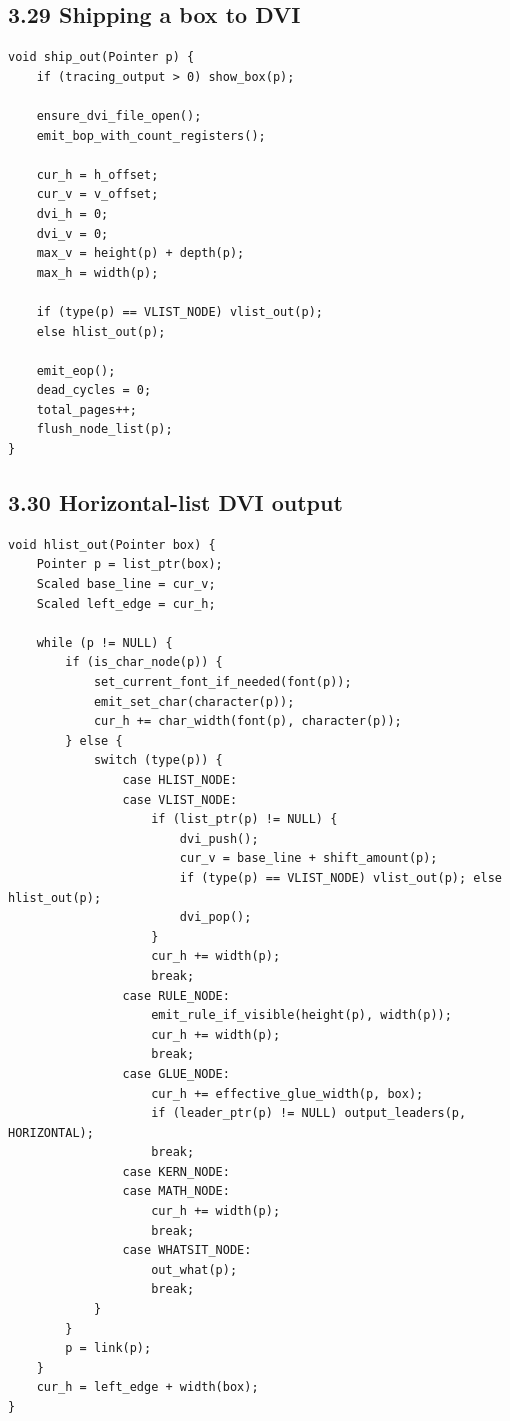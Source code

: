 \documentclass[11pt]{article}
\begin{document}
\subsection{3.29 Shipping a box to DVI}\label{shipping-a-box-to-dvi}

\begin{verbatim}
void ship_out(Pointer p) {
    if (tracing_output > 0) show_box(p);

    ensure_dvi_file_open();
    emit_bop_with_count_registers();

    cur_h = h_offset;
    cur_v = v_offset;
    dvi_h = 0;
    dvi_v = 0;
    max_v = height(p) + depth(p);
    max_h = width(p);

    if (type(p) == VLIST_NODE) vlist_out(p);
    else hlist_out(p);

    emit_eop();
    dead_cycles = 0;
    total_pages++;
    flush_node_list(p);
}
\end{verbatim}

\subsection{3.30 Horizontal-list DVI
output}\label{horizontal-list-dvi-output}

\begin{verbatim}
void hlist_out(Pointer box) {
    Pointer p = list_ptr(box);
    Scaled base_line = cur_v;
    Scaled left_edge = cur_h;

    while (p != NULL) {
        if (is_char_node(p)) {
            set_current_font_if_needed(font(p));
            emit_set_char(character(p));
            cur_h += char_width(font(p), character(p));
        } else {
            switch (type(p)) {
                case HLIST_NODE:
                case VLIST_NODE:
                    if (list_ptr(p) != NULL) {
                        dvi_push();
                        cur_v = base_line + shift_amount(p);
                        if (type(p) == VLIST_NODE) vlist_out(p); else hlist_out(p);
                        dvi_pop();
                    }
                    cur_h += width(p);
                    break;
                case RULE_NODE:
                    emit_rule_if_visible(height(p), width(p));
                    cur_h += width(p);
                    break;
                case GLUE_NODE:
                    cur_h += effective_glue_width(p, box);
                    if (leader_ptr(p) != NULL) output_leaders(p, HORIZONTAL);
                    break;
                case KERN_NODE:
                case MATH_NODE:
                    cur_h += width(p);
                    break;
                case WHATSIT_NODE:
                    out_what(p);
                    break;
            }
        }
        p = link(p);
    }
    cur_h = left_edge + width(box);
}
\end{verbatim}
\end{document}
